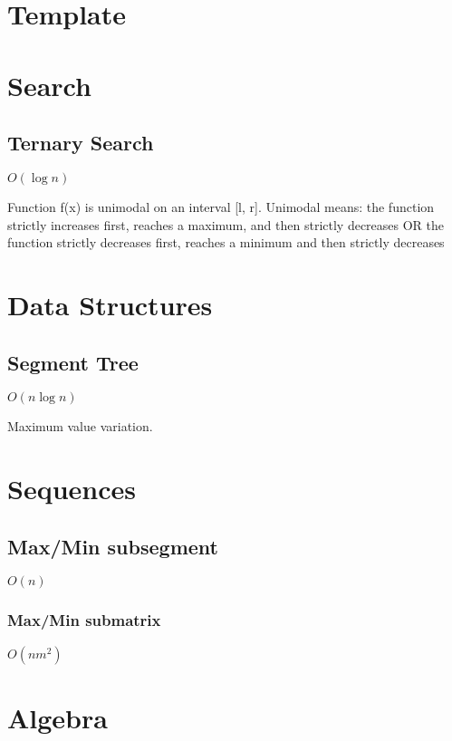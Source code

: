 \documentclass{article}
\begin{document}
\tableofcontents 

\section{Template}


\section{Search}
\subsection{Ternary Search}
$O(\log{n})$

Function f(x) is unimodal on an interval [l, r]. Unimodal means: the function strictly increases first, reaches a maximum, and then strictly decreases OR the function strictly decreases first, reaches a minimum and then strictly decreases


\section{Data Structures}

\subsection{Segment Tree}
$O(n \log n)$

Maximum value variation.


\section{Sequences}
\subsection{Max/Min subsegment}
$O(n)$


\subsubsection{Max/Min submatrix}
$O(nm^2)$


\section{Algebra}
\end{document}
